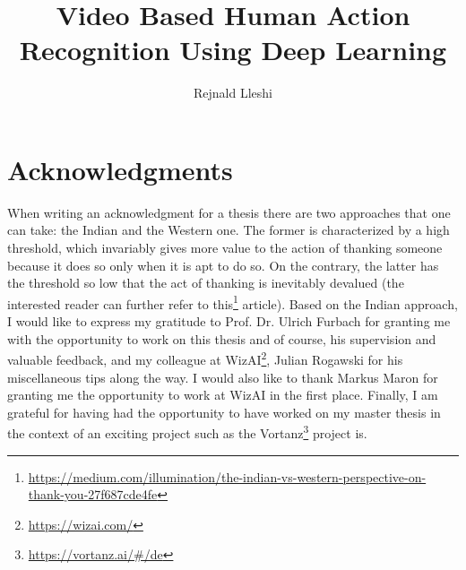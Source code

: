 \documentclass[extern,palatino]{cgMA}
\author{Rejnald Lleshi}
\title{Video Based Human Action Recognition Using Deep Learning}
\begin{document}
\maketitle
\newpage
\clearpage
\newpage
{}

\newpage
\section*{Acknowledgments}
\label{acknowledgements}
When writing an acknowledgment for a thesis there are two approaches that one can take: the Indian and the Western one. The former is characterized by a high threshold, which invariably gives more value to the action of thanking someone because it does so only when it is apt to do so. On the contrary, the latter has the threshold so low that the act of thanking is inevitably devalued (the interested reader can further refer to this\footnote{\url{https://medium.com/illumination/the-indian-vs-western-perspective-on-thank-you-27f687cde4fe}} article). Based on the Indian approach, I would like to express my gratitude to 
Prof. Dr. Ulrich Furbach for granting me with the opportunity to work on this thesis and of course, his supervision and valuable feedback, and my colleague at WizAI\footnote{\url{https://wizai.com/}}, Julian Rogawski for his miscellaneous tips along the way. I would also like to thank Markus Maron for granting me the opportunity to work at WizAI in the first place. Finally, I am grateful for having had the opportunity to have worked on my master thesis in the context of an exciting project such as the Vortanz\footnote{\url{https://vortanz.ai/#/de}} project is.

\newpage
\end{document}
